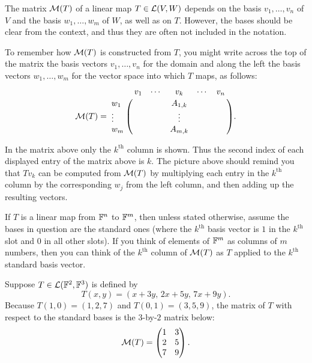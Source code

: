 The matrix $\mathcal{M}(T)$ of a linear map $T\in\mathcal{L}(V,W)$ depends on the basis
$v_1,\dots,v_n$ of $V$ and the basis $w_1,\dots,w_m$ of $W$, as well as on $T$.
However, the bases should be clear from the context, and thus they are often
not included in the notation.

To remember how $\mathcal{M}(T)$ is constructed from $T$, you might write across the
top of the matrix the basis vectors $v_1,\dots,v_n$ for the domain and along
the left the basis vectors $w_1,\dots,w_m$ for the vector space into which $T$
maps, as follows:
\[ \Mat(T) = \bordermatrix{
      & v_1 & \cdots & v_k & \cdots & v_n \cr
  w_1 &     &        & A_{1,k} &    &     \cr
  \vdots &  &        & \vdots  &    &     \cr
  w_m &     &        & A_{m,k} &    &     \cr}. \]

%
In the matrix above only the $k^{\text{th}}$ column is shown. Thus the second
index of each displayed entry of the matrix above is $k$. The picture above
should remind you that $Tv_k$ can be computed from $\mathcal{M}(T)$ by multiplying
each entry in the $k^{\text{th}}$ column by the corresponding $w_j$ from the
left column, and then adding up the resulting vectors.

%
If $T$ is a linear map from $\mathbb{F}^n$ to $\mathbb{F}^m$, then unless stated otherwise,
assume the bases in question are the standard ones (where the
$k^{\text{th}}$ basis vector is $1$ in the $k^{\text{th}}$ slot and $0$ in all
other slots). If you think of elements of $\mathbb{F}^m$ as columns of $m$ numbers,
then you can think of the $k^{\text{th}}$ column of $\mathcal{M}(T)$ as $T$ applied
to the $k^{\text{th}}$ standard basis vector.

\begin{example}\label{ax:3.32}
Suppose $T\in\mathcal{L}(\mathbb{F}^2,\mathbb{F}^3)$ is defined by
\[ T(x,y) = (x+3y,\,2x+5y,\,7x+9y). \]
Because $T(1,0)=(1,2,7)$ and $T(0,1)=(3,5,9)$, the matrix of $T$ with respect
to the standard bases is the $3$-by-$2$ matrix below:
\[ \mathcal{M}(T) = \begin{pmatrix} 1 & 3\\ 2 & 5\\ 7 & 9 \end{pmatrix}. \]
\end{example}

